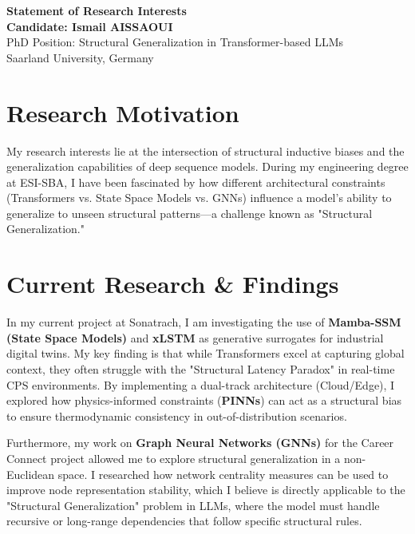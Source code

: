 \documentclass[a4paper,12pt]{article}
\begin{document}
\begin{center}
    {\Large\bfseries Statement of Research Interests}\\[6pt]
    \textbf{Candidate: Ismail AISSAOUI} \\
    PhD Position: Structural Generalization in Transformer-based LLMs \\
    Saarland University, Germany
\end{center}

\bigskip

\section*{Research Motivation}
My research interests lie at the intersection of structural inductive biases and the generalization capabilities of deep sequence models. During my engineering degree at ESI-SBA, I have been fascinated by how different architectural constraints (Transformers vs. State Space Models vs. GNNs) influence a model's ability to generalize to unseen structural patterns—a challenge known as "Structural Generalization."

\section*{Current Research \& Findings}
In my current project at Sonatrach, I am investigating the use of \textbf{Mamba-SSM (State Space Models)} and \textbf{xLSTM} as generative surrogates for industrial digital twins. My key finding is that while Transformers excel at capturing global context, they often struggle with the "Structural Latency Paradox" in real-time CPS environments. By implementing a dual-track architecture (Cloud/Edge), I explored how physics-informed constraints (\textbf{PINNs}) can act as a structural bias to ensure thermodynamic consistency in out-of-distribution scenarios.

Furthermore, my work on \textbf{Graph Neural Networks (GNNs)} for the Career Connect project allowed me to explore structural generalization in a non-Euclidean space. I researched how network centrality measures can be used to improve node representation stability, which I believe is directly applicable to the "Structural Generalization" problem in LLMs, where the model must handle recursive or long-range dependencies that follow specific structural rules.
\end{document}
